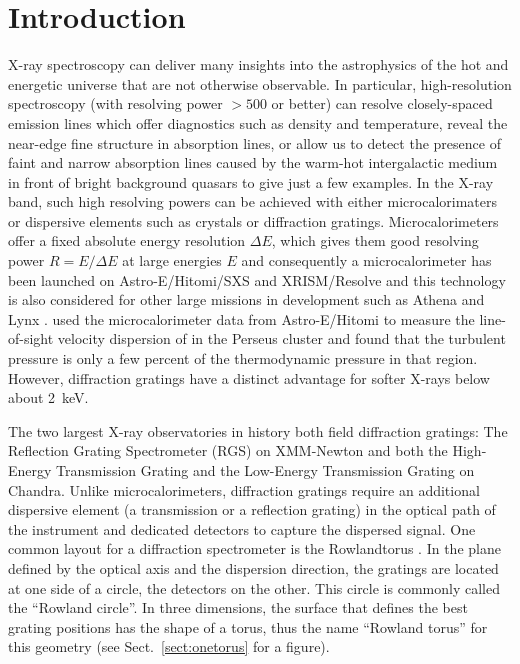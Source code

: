 \documentclass[linenumbers]{aastex631}
\begin{document}
\section{Introduction} \label{sec:intro}
X-ray spectroscopy can deliver many insights into the astrophysics of the hot and energetic universe that are not otherwise observable. In particular, high-resolution spectroscopy (with resolving power $> 500$ or better) can resolve closely-spaced emission lines which offer diagnostics such as density and temperature, reveal the near-edge fine structure in absorption lines, or allow us to detect the presence of faint and narrow absorption lines caused by the warm-hot intergalactic medium in front of bright background quasars to give just a few examples. In the X-ray band, such high resolving powers can be achieved with either microcalorimaters or dispersive elements such as crystals or diffraction gratings. Microcalorimeters offer a fixed absolute energy resolution $\Delta E$, which gives them good resolving power $R=E/\Delta E$ at large energies $E$ and consequently a microcalorimeter has been launched on Astro-E/Hitomi/SXS \citep{2014SPIE.9144E..2AM} and XRISM/Resolve \citep{2018JATIS...4a1214K} and this technology is also considered for other large missions in development such as Athena \citep{2014SPIE.9144E..2LR} and Lynx \citep{2019JATIS...5b1017B}. \citet{2016Natur.535..117H} used the microcalorimeter data from Astro-E/Hitomi to measure the line-of-sight velocity dispersion of  in the Perseus cluster and found that the turbulent pressure is only a few percent of the thermodynamic pressure in that region. However, diffraction gratings have a distinct advantage for softer X-rays below about 2~keV.

The two largest X-ray observatories in history both field diffraction gratings: The Reflection Grating Spectrometer (RGS) on XMM-Newton \citep{2001A&A...365L...7D} and both the High-Energy Transmission Grating  \citep[HETG,][]{2005PASP..117.1144C} and the Low-Energy Transmission Grating \citep[LETG,][]{1997SPIE.3113..172P} on Chandra.
Unlike microcalorimeters, diffraction gratings require an additional dispersive element (a transmission or a reflection grating) in the optical path of the instrument and dedicated detectors to capture the dispersed signal. One common layout for a diffraction spectrometer is the Rowlandtorus \citep{Beuermann:78}. In the plane defined by the optical axis and the dispersion direction, the gratings are located at one side of a circle, the detectors on the other. This circle is commonly called the ``Rowland circle''. In three dimensions, the surface that defines the best grating positions has the shape of a torus, thus the name ``Rowland torus'' for this geometry (see Sect.~\ref{sect:onetorus} for a figure).
\end{document}
